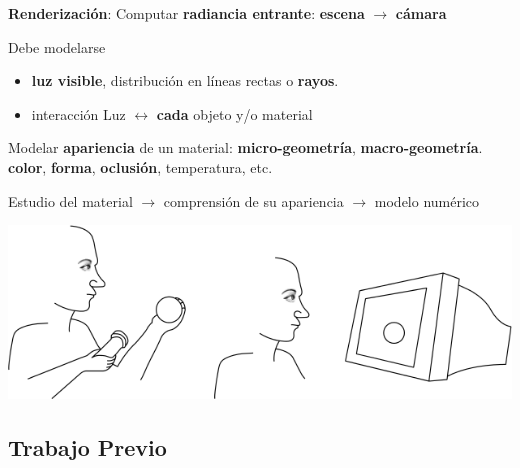 \documentclass[spanish,unknownkeysallowed,10pt]{beamer}
\begin{document}
\begin{frame}{}
\textbf{Renderización}:
Computar \textbf{radiancia entrante}:  \textbf{escena}  $\rightarrow$ \textbf{cámara}

\vspace{0.2cm}

\begin{block}{Debe modelarse}
\begin{itemize}
\item \textbf{luz visible}, distribución en líneas rectas o \textbf{rayos}.
\item interacción Luz $\leftrightarrow$ \textbf{cada} objeto y/o material
\end{itemize}
\end{block}

\vspace{0.2cm}

Modelar \textbf{apariencia} de un material: \textbf{micro-geometría}, \textbf{macro-geometría}. \textbf{color}, \textbf{forma}, \textbf{oclusión}, temperatura, etc.

\vspace{0.2cm}

Estudio del material $\rightarrow$ comprensión de su apariencia $\rightarrow$ modelo numérico

\centerline{\includegraphics[scale = 0.25]{../figures/apariencia}}




\end{frame}

\subsection{Trabajo Previo}
\end{document}
